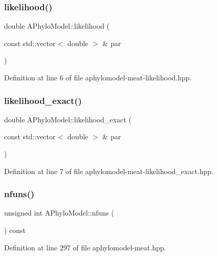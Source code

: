 \subsubsection{\texorpdfstring{likelihood()}{likelihood()}}
{\footnotesize\ttfamily double A\+Phylo\+Model\+::likelihood (\begin{DoxyParamCaption}\item[{const std\+::vector$<$ double $>$ \&}]{par }\end{DoxyParamCaption})}



Definition at line 6 of file aphylomodel-\/meat-\/likelihood.\+hpp.

\mbox{\label{class_a_phylo_model_a22e8844816076c6f13d0371b1b62a22a}} 
\subsubsection{\texorpdfstring{likelihood\+\_\+exact()}{likelihood\_exact()}}
{\footnotesize\ttfamily double A\+Phylo\+Model\+::likelihood\+\_\+exact (\begin{DoxyParamCaption}\item[{const std\+::vector$<$ double $>$ \&}]{par }\end{DoxyParamCaption})}



Definition at line 7 of file aphylomodel-\/meat-\/likelihood\+\_\+exact.\+hpp.

\mbox{\label{class_a_phylo_model_ad50c485128331dcfc3e24ef3765d36ef}} 
\subsubsection{\texorpdfstring{nfuns()}{nfuns()}}
{\footnotesize\ttfamily unsigned int A\+Phylo\+Model\+::nfuns (\begin{DoxyParamCaption}{ }\end{DoxyParamCaption}) const}



Definition at line 297 of file aphylomodel-\/meat.\+hpp.

\mbox{\label{class_a_phylo_model_adfb761d08367323cd94e917a5249bd86}} 

